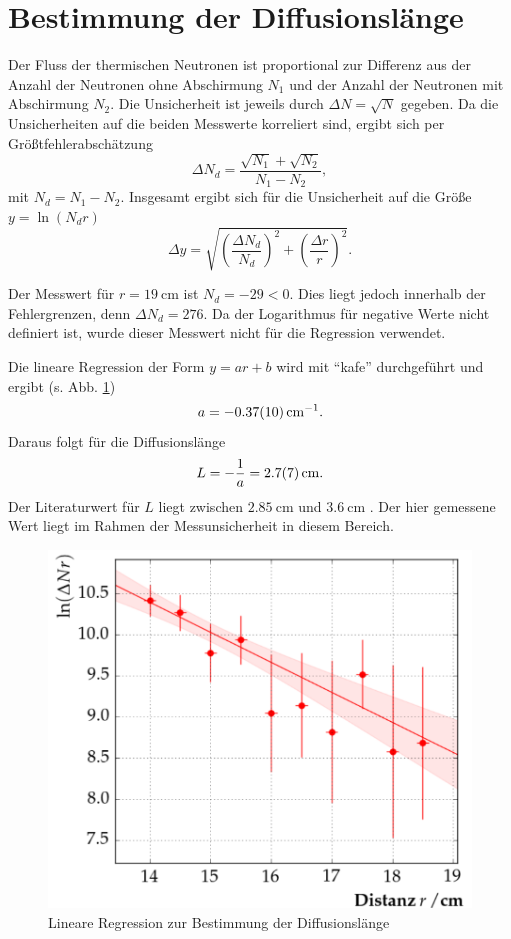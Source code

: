 \section{Bestimmung der Diffusionslänge}

Der Fluss der thermischen Neutronen ist proportional zur Differenz aus der Anzahl der Neutronen ohne Abschirmung $N_{1}$ und der Anzahl der Neutronen mit Abschirmung $N_{2}$. Die Unsicherheit ist jeweils durch $\Delta N=\sqrt{N}$ gegeben.
Da die Unsicherheiten auf die beiden Messwerte korreliert sind, ergibt sich per Größtfehlerabschätzung
\begin{equation}
 \Delta N_{d} = \frac{\sqrt{N_{1}}+\sqrt{N_{2}}}{N_{1}-N_{2}},
\end{equation}
mit $N_{d}=N_{1}-N_{2}$.
Insgesamt ergibt sich für die Unsicherheit auf die Größe $y=\ln(N_{d}r)$
\begin{equation}
 \Delta y = \sqrt{\left(\frac{\Delta N_{d}}{N_{d}}\right)^{2}+\left(\frac{\Delta r}{r}\right)^{2}}.
\end{equation}

Der Messwert für $r=\SI{19}{\centi\metre}$ ist $N_{d}=-29<0$. Dies liegt jedoch innerhalb der Fehlergrenzen, denn $\Delta N_{d}=276$. Da der Logarithmus für negative Werte nicht definiert ist, wurde dieser Messwert nicht für die Regression verwendet.

Die lineare Regression der Form $y=ar+b$ wird mit ``kafe'' durchgeführt und ergibt (s. Abb. \ref{fig:plot3})
\begin{equation}
 a = \SI{-0,37\pm0,10}{\per\centi\metre}.
\end{equation}
Daraus folgt für die Diffusionslänge
\begin{equation}
 L = -\frac{1}{a} = \SI{2,7\pm0,7}{\centi\metre}.
\end{equation}
Der Literaturwert für $L$ liegt zwischen $\SI{2,85}{\centi\metre}$ und $\SI{3,6}{\centi\metre}$ \cite{DeJuren}. Der hier gemessene Wert liegt im Rahmen der Messunsicherheit in diesem Bereich.

\begin{figure}[tb]
  \centering
  \includegraphics[scale=0.5]{./fig/plot3.png}
  \caption{Lineare Regression zur Bestimmung der Diffusionslänge}
  \label{fig:plot3}
\end{figure}

